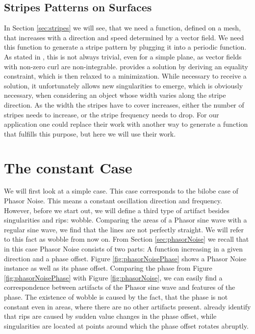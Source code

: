 \documentclass{utue} %
\begin{document}
\subsection{Stripes Patterns on Surfaces}
In Section \ref{sec:stripes} we will see, that we need a function, defined on a mesh, that increases with a direction and speed determined by a vector field. We need this function to generate a stripe pattern by plugging it into a periodic function. As stated in \cite{stripes}, this is not always trivial, even for a simple plane, as vector fields with non-zero curl are non-integrable. \cite{stripes} provides a solution by deriving an equality constraint, which is then relaxed to a minimization. While necessary to receive a solution, it unfortunately allows new singularities to emerge, which is obviously necessary, when considering an object whose width varies along the stripe direction. As the width the stripes have to cover increases, either the number of stripes needs to increase, or the stripe frequency needs to drop. For our application one could replace their work with another way to generate a function that fulfills this purpose, but here we will use their work.

\section{The constant Case}
We will first look at a simple case. This case corresponds to the bilobe case of Phasor Noise. This means a constant oscillation direction and frequency. However, before we start out, we will define a third type of artifact besides singularities and rips: wobble. Comparing the areas of a Phasor sine wave with a regular sine wave, we find that the lines are not perfectly straight. We will refer to this fact as wobble from now on. From Section \ref{sec:phasorNoise} we recall that in this case Phasor Noise consists of two parts: A function increasing in a given direction and a phase offset. Figure \ref{fig:phasorNoisePhase} shows a Phasor Noise instance as well as its phase offset. Comparing the phase from Figure \ref{fig:phasorNoisePhase} with Figure \ref{fig:phasorNoise}, we can easily find a correspondence between artifacts of the Phasor sine wave and features of the phase. The existence of wobble is caused by the fact, that the phase is not constant even in areas, where there are no other artifacts present. \citeauthor{phasorNoise} already identify that rips are caused by sudden value changes in the phase offset, while singularities are located at points around which the phase offset rotates abruptly.\\
\end{document}
